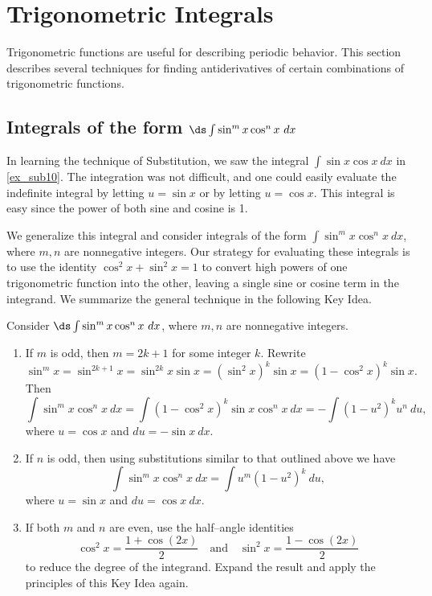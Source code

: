 

\section{Trigonometric Integrals}\label{sec:trigint}

Trigonometric functions are useful for describing periodic behavior. This section describes several techniques for finding antiderivatives of certain combinations of trigonometric functions.

\subsection{\texorpdfstring{Integrals of the form $\ds \int \sin^m x\cos^n x\ dx$}{Integrands of the form (sin x)\^{}m (cos x)\^{}n}}

In learning the technique of Substitution, we saw the integral $\int \sin x\cos x\ dx$ in \autoref{ex_sub10}. The integration was not difficult, and one could easily evaluate the indefinite integral by letting $u=\sin x$ or by letting $u = \cos x$. This integral is easy since the power of both sine and cosine is 1.

We generalize this integral and consider integrals of the form $\int \sin^mx\cos^nx\ dx$, where $m,n$ are nonnegative integers. Our strategy for evaluating these integrals is to use the identity $\cos^2x+\sin^2x=1$ to convert high powers of one trigonometric function into the other, leaving a single sine or cosine term in the integrand. We summarize the general technique in the following Key Idea.


\setboxwidth{60pt}
{Consider $\ds \int \sin^mx\cos^nx\ dx$, where $m,n$ are nonnegative integers.
\begin{enumerate}
	\item	If $m$ is odd, then $m=2k+1$ for some integer $k$. Rewrite \small
		\[
		\sin^mx = \sin^{2k+1}x = \sin^{2k}x\sin x = (\sin^2x)^k\sin x = (1-\cos^2x)^k\sin x.
		\]
		\normalsize Then \small
		\[
		\int \sin^mx\cos^nx\ dx = \int (1-\cos^2x)^k\sin x\cos^nx\ dx = -\int (1-u^2)^ku^n\ du,
		\]
		\normalsize where $u = \cos x$ and $du = -\sin x\ dx$. 
	\item	If $n$ is odd, then using substitutions similar to that outlined above we have \small
		\[\int \sin^mx\cos^nx\ dx = \int u^m(1-u^2)^k\ du,\]
		\normalsize where $u = \sin x$ and $du = \cos x\ dx$.
	\item	If both $m$ and $n$ are even, use the half--angle identities \small
		\[
		\cos^2x = \frac{1+\cos (2x)}{2} \quad \text{and}\quad \sin^2x = \frac{1-\cos(2x)}2
		\]
		\normalsize to reduce the degree of the integrand. Expand the result and apply the principles of this Key Idea again.
	\end{enumerate}}

